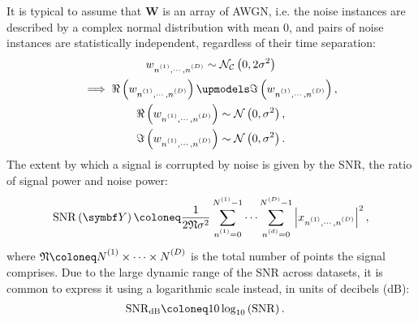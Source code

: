 It is typical to assume that $\symbf{W}$ is an array of \ac{AWGN}, i.e.
the noise instances are described by a complex normal distribution with mean 0,
and pairs of noise instances are statistically independent, regardless of their
time separation:
\begin{subequations}
    \begin{gather}
        \wnonenD \sim
        \mathcal{N_C}\left(0, 2\sigma^2\right) \\
        \begin{gathered}
            \implies \Re\left(\wnonenD\right) \upmodels \Im\left(\wnonenD\right),\\
             \Re\left(\wnonenD\right) \sim \mathcal{N}\left(0, \sigma^2\right),\\
             \Im\left(\wnonenD\right) \sim \mathcal{N}\left(0, \sigma^2\right). \\
        \end{gathered}
    \end{gather}
\end{subequations}
The extent by which a signal is corrupted by noise is given by the \ac{SNR},
the ratio of signal power and noise power:
\begin{equation}
    \SNR\left(\bY\right) \coloneq
        \frac{1}{2 \mathfrak{N} \sigma^2}
        \sum_{\none=0}^{\None-1} \cdots \sum_{\nd=0}^{\ND-1}
        \left \lvert \xnonenD \right \rvert^2,
\end{equation}
where $\mathfrak{N} \coloneq \None \times \cdots \times \ND$ is the total
number of points the signal comprises. Due to the large dynamic range of the
\ac{SNR} across datasets, it is common to express it using a logarithmic scale
instead, in units of decibels (\unit{\deci\bel}):
\begin{equation}
    \begin{split}
        \SNR_{\unit{\deci\bel}} &\coloneq 10 \log_{10} \left(\SNR\right).
    \end{split}
\end{equation}

